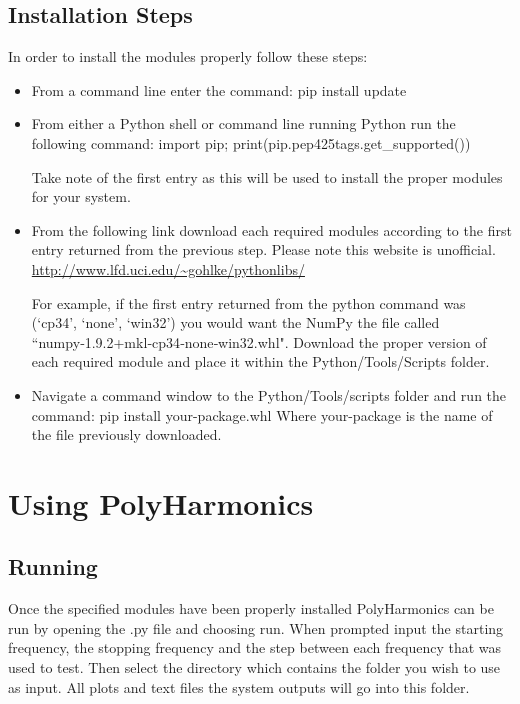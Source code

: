 \documentclass[12pt]{article}
\newcommand{\progname}{PolyHarmonics}
\begin{document}
\subsection{Installation Steps}
In order to install the modules properly follow these steps:
\begin{itemize}
\item From a command line enter the command: pip install update
\item From either a Python shell or command line running Python run the 
following command: import pip; print(pip.pep425tags.get\_supported())

Take note of the first entry as this will be used to install the proper 
modules for your system.
\item From the following link download each required modules according to the 
first entry returned from the previous step. Please note this website is unofficial. \newline
\url{http://www.lfd.uci.edu/~gohlke/pythonlibs/}

For example, if the first entry returned from the python command was (`cp34',
`none', `win32') you would want the NumPy the file called 
``numpy‑1.9.2+mkl‑cp34‑none‑win32.whl". Download the proper version of each
required module and place it within the \newline
Python/Tools/Scripts folder.
\item Navigate a command window to the Python/Tools/scripts folder and run the 
command: pip install your-package.whl  
\newline Where your-package is the name of the 
file previously downloaded.
\end{itemize}


\section{Using \progname{}}

\subsection{Running}
Once the specified modules have been properly installed \progname{} can be run 
by opening the .py file and choosing run. 
\newline When prompted input the starting frequency, the stopping frequency and 
the step between each frequency that was used to test. Then select the directory 
which contains the folder you wish to use as input. All plots and text files the 
system outputs will go into this folder.
\end{document}

